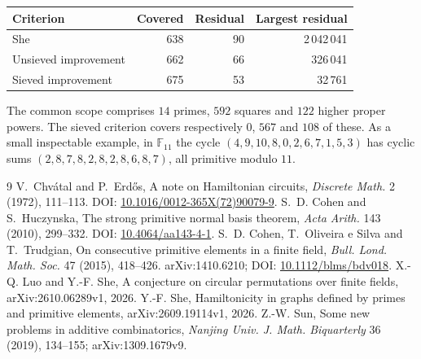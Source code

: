 \documentclass[11pt]{amsart}
\begin{document}
\begin{center}
\begin{tabular}{lrrr}
Criterion & Covered & Residual & Largest residual\\\hline
She &638&90&2\,042\,041\\
Unsieved improvement &662&66&326\,041\\
Sieved improvement &675&53&32\,761
\end{tabular}
\end{center}
The common scope comprises $14$ primes, $592$ squares and $122$ higher
proper powers. The sieved criterion covers respectively $0$, $567$ and
$108$ of these. As a small inspectable example, in $\mathbb F_{11}$ the
cycle $(4,9,10,8,0,2,6,7,1,5,3)$ has cyclic sums
$(2,8,7,8,2,8,2,8,6,8,7)$, all primitive modulo $11$.

\begin{thebibliography}{9}
 V.~Chv\'atal and P.~Erd\H{o}s, A note on Hamiltonian circuits, \emph{Discrete Math.} 2 (1972), 111--113.
DOI: \href{https://doi.org/10.1016/0012-365X(72)90079-9}{10.1016/0012-365X(72)90079-9}.
 S.~D. Cohen and S.~Huczynska, The strong primitive normal basis theorem,
\emph{Acta Arith.} 143 (2010), 299--332. DOI: \href{https://doi.org/10.4064/aa143-4-1}{10.4064/aa143-4-1}.
 S.~D. Cohen, T.~Oliveira e Silva and T.~Trudgian, On consecutive primitive elements in a finite field, \emph{Bull. Lond. Math. Soc.} 47 (2015), 418--426.
arXiv:1410.6210; DOI: \href{https://doi.org/10.1112/blms/bdv018}{10.1112/blms/bdv018}.
 X.-Q. Luo and Y.-F. She, A conjecture on circular permutations over finite fields, arXiv:2610.06289v1, 2026.
 Y.-F. She, Hamiltonicity in graphs defined by primes and primitive elements, arXiv:2609.19114v1, 2026.
 Z.-W. Sun, Some new problems in additive combinatorics, \emph{Nanjing Univ. J. Math. Biquarterly} 36 (2019), 134--155; arXiv:1309.1679v9.
\end{thebibliography}
\end{document}
